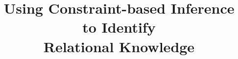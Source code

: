\documentclass{www2010-submission}
\begin{document}
%

\title{Using Constraint-based Inference to Identify \\ Relational Knowledge}


%
%
%
%
%
\end{document}
